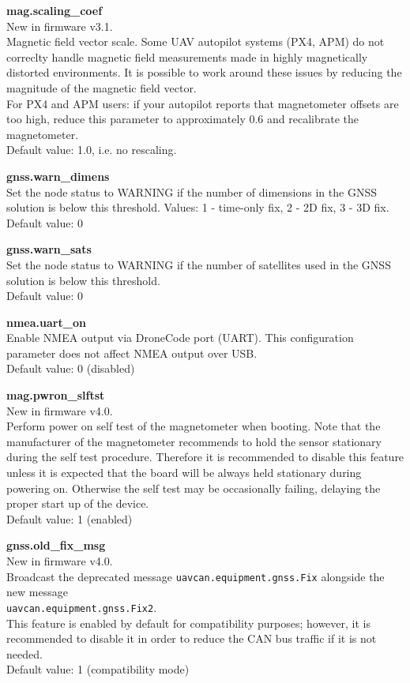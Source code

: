 \documentclass{zubaxdoc}
\begin{document}
\textbf{mag.scaling{\_}coef}\\
New in firmware v3.1.\\
Magnetic field vector scale. Some UAV autopilot systems (PX4, APM) do not correclty handle magnetic field measurements made in highly magnetically distorted environments. It is possible to work around these issues by reducing the magnitude of the magnetic field vector.\\
For PX4 and APM users: if your autopilot reports that magnetometer offsets are too high, reduce this parameter to approximately 0.6 and recalibrate the magnetometer.\\
Default value: 1.0, i.e. no rescaling.

\textbf{gnss.warn{\_}dimens}\\
Set the node status to WARNING if the number of dimensions in the GNSS solution is below this threshold. Values: 1 - time-only fix, 2 - 2D fix, 3 - 3D fix.\\
Default value: 0

\textbf{gnss.warn{\_}sats}\\
Set the node status to WARNING if the number of satellites used in the GNSS solution is below this threshold.\\
Default value: 0

\textbf{nmea.uart{\_}on}\\
Enable NMEA output via DroneCode port (UART). This configuration parameter does not affect NMEA output over USB.\\
Default value: 0 (disabled)

\textbf{mag.pwron{\_}slftst}\\
New in firmware v4.0.\\
Perform power on self test of the magnetometer when booting. Note that the manufacturer of the magnetometer recommends to hold the sensor stationary during the self test procedure. Therefore it is recommended to disable this feature unless it is expected that the board will be always held stationary during powering on. Otherwise the self test may be occasionally failing, delaying the proper start up of the device.\\
Default value: 1 (enabled)

\textbf{gnss.old{\_}fix{\_}msg}\\
New in firmware v4.0.\\
Broadcast the deprecated message \texttt{uavcan.equipment.gnss.Fix} alongside the new message\\ \texttt{uavcan.equipment.gnss.Fix2}.\\This feature is enabled by default for compatibility purposes; however, it is recommended to disable it in order to reduce the CAN bus traffic if it is not needed.\\
Default value: 1 (compatibility mode)
\end{document}
